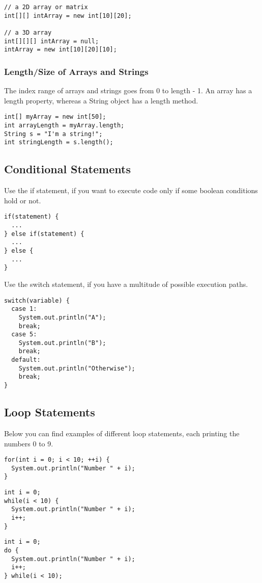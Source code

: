 \documentclass[papersize=a4,paper=landscape,11pt]{scrartcl}
\begin{document}
\begin{multicols*}{3}
\begin{lstlisting}
// a 2D array or matrix
int[][] intArray = new int[10][20];

// a 3D array
int[][][] intArray = null;
intArray = new int[10][20][10];
\end{lstlisting}

\subsubsection*{Length/Size of Arrays and Strings}
The index range of arrays and strings goes from 0 to length - 1.
An array has a length property, whereas a String object has a length method.

\begin{lstlisting}
int[] myArray = new int[50];
int arrayLength = myArray.length;
String s = "I'm a string!";
int stringLength = s.length();
\end{lstlisting}

\subsection*{Conditional Statements}
Use the if statement, if you want to execute code only if some boolean conditions hold or not.
\begin{lstlisting}
if(statement) {
  ...
} else if(statement) {
  ...
} else {
  ...
}
\end{lstlisting}
Use the switch statement, if you have a multitude of possible execution paths.
\begin{lstlisting}
switch(variable) {
  case 1:
    System.out.println("A");
    break;
  case 5:
    System.out.println("B");
    break;
  default:
    System.out.println("Otherwise");
    break;
}
\end{lstlisting}

\subsection*{Loop Statements}
Below you can find examples of different loop statements, each printing the numbers 0 to 9.
\begin{lstlisting}
for(int i = 0; i < 10; ++i) {
  System.out.println("Number " + i);
}
\end{lstlisting}

\begin{lstlisting}
int i = 0;
while(i < 10) {
  System.out.println("Number " + i);
  i++;
}
\end{lstlisting}

\begin{lstlisting}
int i = 0;
do {
  System.out.println("Number " + i);
  i++;
} while(i < 10);
\end{lstlisting}


\end{multicols*}
\end{document}
